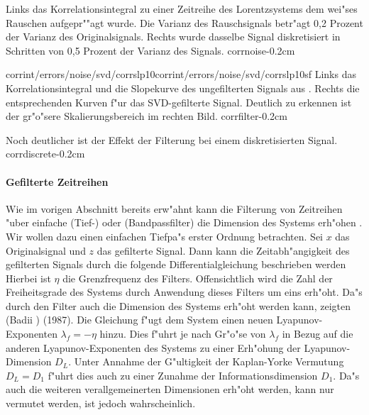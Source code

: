 {Links das Korrelationsintegral zu einer Zeitreihe des Lorentzsystems dem wei"ses
Rauschen aufgepr""agt wurde. Die Varianz des Rauschsignals betr"agt 0,2 Prozent der Varianz des
Originalsignals. Rechts wurde dasselbe Signal diskretisiert in Schritten von 0,5 Prozent
der Varianz des Signals.
}{corrnoise}{-0.2cm}

{corrint/errors/noise/svd/corrslp10}{corrint/errors/noise/svd/corrslp10sf}
{Links das Korrelationsintegral und die Slopekurve des ungefilterten Signals aus
. Rechts die entsprechenden Kurven f"ur das SVD-gefilterte
Signal. Deutlich zu erkennen ist der gr"o"sere Skalierungsbereich im rechten Bild.
}{corrfilter}{-0.2cm}

{Noch deutlicher ist der Effekt der Filterung bei einem diskretisierten Signal.
}{corrdiscrete}{-0.2cm}

\paragraph{Gefilterte Zeitreihen}
Wie im vorigen Abschnitt bereits erw"ahnt kann die Filterung von Zeitreihen "uber einfache 
\begriff(Tief-) oder \begriff(Bandpassfilter) die Dimension des Systems erh"ohen \cite{badii-politi}. Wir wollen dazu einen
einfachen Tiefpa"s erster Ordnung betrachten. Sei $x$ das Originalsignal und $z$ das
gefilterte Signal. Dann kann die Zeitabh"angigkeit des gefilterten Signals durch die
folgende Differentialgleichung beschrieben werden
Hierbei ist $\eta$ die Grenzfrequenz des Filters. Offensichtlich wird die Zahl der
Freiheitsgrade des Systems durch Anwendung dieses Filters um eins erh"oht. Da"s durch den
Filter auch die Dimension des Systems erh"oht werden kann, zeigten \autor(Badii \etal)
(1987). Die Gleichung f"ugt dem System einen neuen Lyapunov-Exponenten
$\lambda_f=-\eta$ hinzu. Dies f"uhrt je nach Gr"o"se von $\lambda_f$ in Bezug auf die
anderen Lyapunov-Exponenten des Systems zu einer Erh"ohung der Lyapunov-Dimension
$D_L$. Unter Annahme der G"ultigkeit der  Kaplan-Yorke Vermutung $D_L=D_1$ f"uhrt dies
auch zu einer Zunahme der Informationsdimension $D_1$. Da"s auch die weiteren
verallgemeinerten Dimensionen erh"oht werden, kann nur vermutet werden, ist jedoch
wahrscheinlich.

